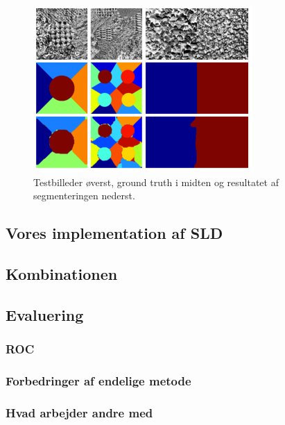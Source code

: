 \begin{figure}[H]
		\centering
		\includegraphics[scale=1]{files/postmethod/img/dict_6.png}
	\caption{Testbilleder øverst, ground truth i midten og resultatet af segmenteringen nederst.\label{fig:postmethod_sld_testing}}
\end{figure}

\subsection{Vores implementation af SLD}

\subsection{Kombinationen} %
\subsection{Evaluering}
\subsubsection{ROC}
\subsubsection{Forbedringer af endelige metode}
\subsubsection{Hvad arbejder andre med} %
